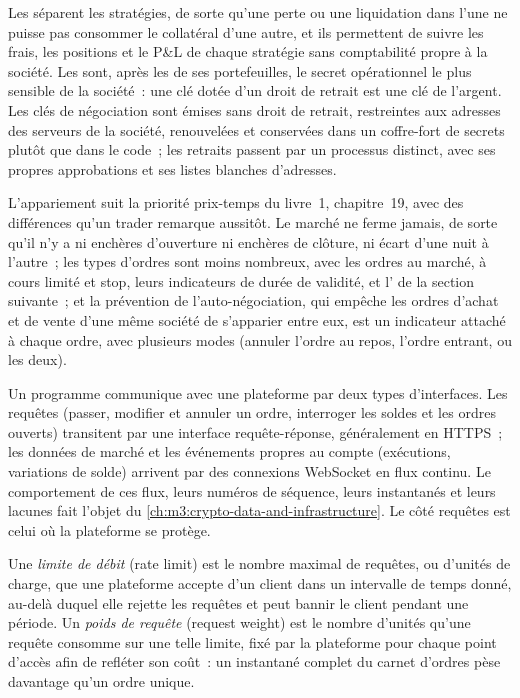 Les  séparent les stratégies, de sorte qu'une perte ou une liquidation dans l'une ne puisse pas consommer le
collatéral d'une autre, et ils permettent de suivre les frais, les positions et le P\&L de chaque stratégie sans comptabilité propre à la
société. Les  sont, après les  de ses portefeuilles, le secret opérationnel le plus sensible de la
société~: une clé dotée d'un droit de retrait est une clé de l'argent. Les clés de négociation sont émises sans droit de retrait,
restreintes aux adresses des serveurs de la société, renouvelées et conservées dans un coffre-fort de secrets plutôt que dans le code~;
les retraits passent par un processus distinct, avec ses propres approbations et ses listes blanches d'adresses.

L'appariement suit la priorité prix-temps du livre~1, chapitre~19, avec des différences qu'un trader
remarque aussitôt. Le marché ne ferme jamais, de sorte qu'il n'y a ni enchères d'ouverture ni enchères de clôture, ni écart d'une nuit
à l'autre~; les types d'ordres sont moins nombreux, avec les ordres au marché, à cours limité et stop, leurs indicateurs de durée de validité, et
l' de la section suivante~; et la prévention de l'auto-négociation, qui empêche les ordres d'achat et de vente d'une même société de
s'apparier entre eux, est un indicateur attaché à chaque ordre, avec plusieurs modes (annuler l'ordre au repos,
l'ordre entrant, ou les deux).

Un programme communique avec une plateforme par deux types d'interfaces. Les requêtes (passer, modifier et annuler un ordre,
interroger les soldes et les ordres ouverts) transitent par une interface requête-réponse, généralement en HTTPS~; les données de
marché et les événements propres au compte (exécutions, variations de solde) arrivent par des connexions WebSocket en flux continu. Le
comportement de ces flux, leurs numéros de séquence, leurs instantanés et leurs lacunes fait l'objet du
\cref{ch:m3:crypto-data-and-infrastructure}. Le côté requêtes est celui où la plateforme se protège.

\begin{definition}\label{def:m3:centralised-exchanges:ratelimit}
Une \emph{limite de débit} (rate limit) est le nombre maximal de requêtes, ou d'unités de charge, que
une plateforme accepte d'un client dans un intervalle de temps donné, au-delà duquel elle rejette les requêtes et peut bannir le client
pendant une période. Un \emph{poids de requête} (request weight) est le nombre d'unités qu'une requête consomme sur une telle limite,
fixé par la plateforme pour chaque point d'accès afin de refléter son coût~: un instantané complet
du carnet d'ordres pèse davantage qu'un ordre unique.
\end{definition}

